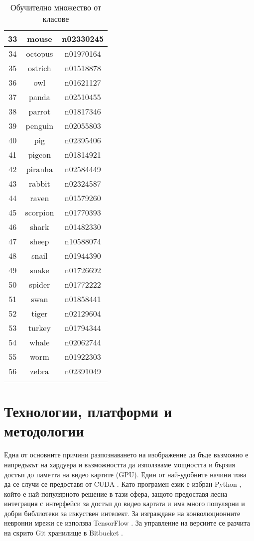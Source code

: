 \begin{longtable}{ | c | c | c | }
33 & mouse & n02330245 \\ \hline
34 & octopus & n01970164 \\ \hline
35 & ostrich & n01518878 \\ \hline
36 & owl & n01621127 \\ \hline
37 & panda & n02510455 \\ \hline
38 & parrot & n01817346 \\ \hline
39 & penguin & n02055803 \\ \hline
40 & pig & n02395406 \\ \hline
41 & pigeon & n01814921 \\ \hline
42 & piranha & n02584449 \\ \hline
43 & rabbit & n02324587 \\ \hline
44 & raven & n01579260 \\ \hline
45 & scorpion & n01770393 \\ \hline
46 & shark & n01482330 \\ \hline
47 & sheep & n10588074 \\ \hline
48 & snail & n01944390 \\ \hline
49 & snake & n01726692 \\ \hline
50 & spider & n01772222 \\ \hline
51 & swan & n01858441 \\ \hline
52 & tiger & n02129604 \\ \hline
53 & turkey & n01794344 \\ \hline
54 & whale & n02062744 \\ \hline
55 & worm & n01922303 \\ \hline
56 & zebra & n02391049 \\ \hline
\caption{Обучително множество от класове}
\label{tab:tableclasses}
\end{longtable}

\section{Технологии, платформи и методологии}
Една от основните причини разпознаването на изображение да бъде възможно е напредъкът на хардуера и възможността да използваме мощността и бързия достъп до паметта на видео картите (GPU). Един от най-удобните начини това да се случи се предоставя от CUDA \cite{CUDA}. Като програмен език е избран Python \cite{Python}, който е най-популярното решение в тази сфера, защото предоставя лесна интеграция с интерфейси за достъп до видео картата и има много популярни и добри библиотеки за изкуствен интелект. За изграждане на конволюционните невронни мрежи се използва TensorFlow \cite{Tensorflow}. За управление на версиите се разчита на скрито Git хранилище в Bitbucket \cite{Bitbucket}.

